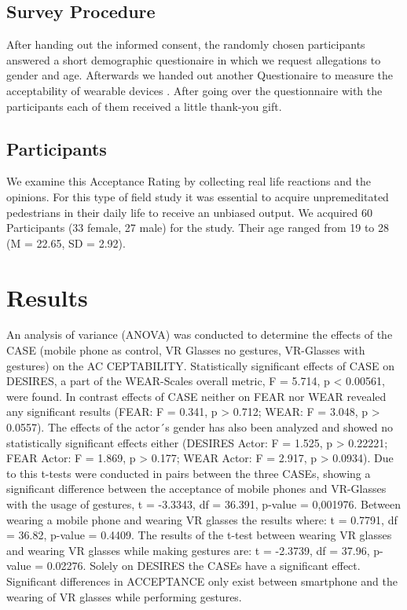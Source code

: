 \documentclass[sigchi]{acmart}
\begin{document}
\subsection{Survey Procedure}

After handing out the informed consent, the randomly chosen participants answered a short demographic questionaire in which we request allegations to gender and age. Afterwards we handed out another Questionaire to measure the acceptability of wearable devices \cite{kelly2016wear}. After going over the questionnaire with the participants each of them received a little thank-you gift.

\subsection{Participants}

We examine this Acceptance Rating by collecting real life reactions and the opinions. For this type of field study it was essential to acquire unpremeditated pedestrians in their daily life to receive an unbiased output. We acquired 60 Participants (33 female, 27 male) for the study. Their age ranged from 19 to 28 (M = 22.65, SD = 2.92).

\section {Results}
An analysis of variance (ANOVA) was conducted to determine the effects of the CASE (mobile phone as control, VR Glasses no gestures, VR-Glasses with gestures) on the AC CEPTABILITY. Statistically significant effects of CASE on DESIRES, a part of the WEAR-Scales overall metric, F = 5.714, p < 0.00561, were found. In contrast effects of CASE neither on FEAR nor WEAR revealed any significant results (FEAR: F = 0.341, p > 0.712; WEAR: F = 3.048, p > 0.0557). The effects of the actor´s gender has also been analyzed and showed no statistically significant effects either (DESIRES Actor: F = 1.525, p > 0.22221; FEAR Actor: F = 1.869, p > 0.177; WEAR Actor: F = 2.917, p > 0.0934). Due to this t-tests were conducted in pairs between the three CASEs, showing a significant difference between the acceptance of mobile phones and VR-Glasses with the usage of gestures, t = -3.3343, df = 36.391, p-value = 0,001976. Between wearing a mobile phone and wearing VR glasses the results where: t = 0.7791, df = 36.82, p-value = 0.4409. The results of the t-test between wearing VR glasses and wearing VR glasses while making gestures are: t = -2.3739, df = 37.96, p-value = 0.02276. Solely on DESIRES the CASEs have a significant effect. Significant differences in ACCEPTANCE only exist between smartphone and the wearing of VR glasses while performing gestures.
\end{document}
